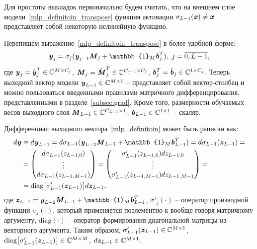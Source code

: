 Для простоты выкладок первоначально будем считать, что на внешнем слое модели~\eqref{mlp_definitoin_transpose} функция активации $\sigma_{L-1}(\textbf{\textit{x}})\neq\textbf{\textit{x}}$ представляет собой некоторую нелинейную функцию.

Перепишем выражение~\eqref{mlp_definitoin_transpose} в более удобной форме:
\begin{equation}
	\bit{y}_j=
	\sigma_j(\bit{y}_{j-1}\bit{M}_{j}+\mathbb{1}_M\bit{b}_{j}^T), \text{	} j=\overline{0,L-1},
	\label{mlp_definitoin}
\end{equation}
где $\textbf{\textit{y}}_{j}=\hat{\textbf{\textit{y}}}_{j}^T\in\mathbb{C}^{M\times C_j}$, $\textbf{\textit{M}}_{j}=\hat{\textbf{\textit{M}}}_{j}^T\in\mathbb{C}^{C_{j-1}\times C_j}$, $\textbf{\textit{b}}_{j}^T=\hat{\textbf{\textit{b}}}_{j}\in\mathbb{C}^{1\times C_j}$. Теперь выходной вектор модели $\textbf{\textit{y}}_{L-1}\in\mathbb{C}^{M\times 1}$ -- представляет собой вектор-столбец и можно пользоваться введенными правилами матричного дифференцирования, представленными в разделе~\ref{subsec:grad}. Кроме того, размерности обучаемых весов выходного слоя $\textbf{\textit{M}}_{L-1}\in\mathbb{C}^{C_{L-1}\times1}$, $\textbf{\textit{b}}_{L-1}\in\mathbb{C}^{1\times1}$ -- скаляр.

Дифференциал выходного вектора~\eqref{mlp_definitoin} может быть раписан как:
\begin{align}
	d\bit{y}&\equiv d\bit{y}_{L-1}=d\sigma_{L-1}(\bit{y}_{L-2}\bit{M}_{L-1}+\mathbb{1}_M\bit{b}_{L-1}^T)=d\sigma_{L-1}(\bit{z}_{L-1})=\nonumber \\
	&=\begin{pmatrix}
		d\sigma_{L-1}(z_{L-1, 0}) \\
		\vdots \\
		d\sigma_{L-1}(z_{L-1, M-1})
	\end{pmatrix}=
	\begin{pmatrix}
		\sigma'_{L-1}(z_{L-1, 0})dz_{L-1, 0} \\
		\vdots \\
		\sigma'_{L-1}(z_{L-1, M-1})dz_{L-1, M-1}
	\end{pmatrix}= \nonumber \\
	&=\text{diag}\big[\sigma'_{L-1}(\bit{z}_{L-1})\big]d\bit{z}_{L-1},
	\label{differential_mlp_output_full}
\end{align}
где $\bit{z}_{L-1}=\bit{y}_{L-2}\bit{M}_{L-1}+\mathbb{1}_M\bit{b}_{L-1}^T$, $\sigma'_{j}(\cdot)$ -- оператор производной функции $\sigma_j(\cdot)$, который применяется поэлементно к вообще говоря матричному аргументу, $\text{diag}(\cdot)$ -- оператор формирования диагональной матрицы из векторного аргумента. Таким образом, $\sigma'_{L-1}(\textbf{\textit{z}}_{L-1})\in\mathbb{C}^{M\times1}$, $\text{diag}\big[\sigma'_{L-1}(\textbf{\textit{z}}_{L-1})\big]\in\mathbb{C}^{M\times M}$, $d\textbf{\textit{z}}_{L-1}\in\mathbb{C}^{M\times1}$.

